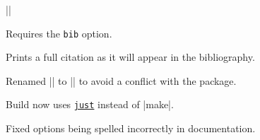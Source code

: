 \documentclass{ltxguidex}
\newcommand{\reqopt}[1]{Requires the \texttt{\color{magenta}#1} option.\par}
\begin{document}
\begin{desc}
||
\end{desc}

\reqopt{bib} Prints a full citation as it will appear in the bibliography.

\begin{changelog}[author=Rebecca Turner]
\begin{version}[v=0.2.0, date=2019-10-15]
\changed
  \item Renamed |\intro| to |\essayintro| to avoid a conflict with the
     package.
  \item Build now uses \href{https://github.com/casey/just}{\texttt{just}} instead of
  |make|.
\fixed
  \item Fixed options being spelled incorrectly in documentation.
\end{version}
\end{changelog}
\end{document}
